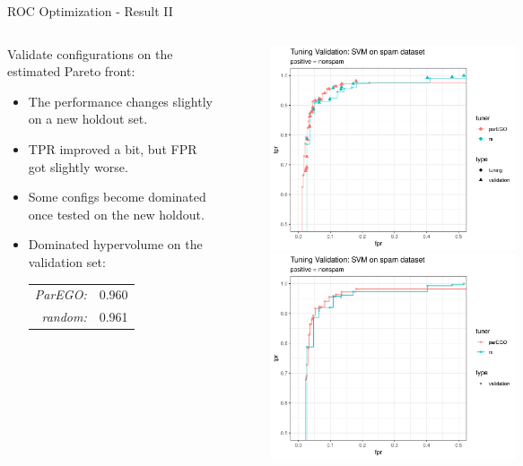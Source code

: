 \documentclass[11pt,compress,t,notes=noshow,xcolor=table]{beamer}
\begin{document}
\begin{vbframe}{ROC Optimization - Result II}

\begin{columns}
\begin{column}{0.42\textwidth}
Validate configurations on the estimated Pareto front:
\begin{itemize}
  \item The performance changes slightly on a new holdout set.
  \item TPR improved a bit, but FPR got slightly worse.
  \item Some configs become dominated once tested on the new holdout.
  \item Dominated hypervolume on the validation set:
  \begin{tabular}{rl}
    \emph{ParEGO:} & 0.960\\
    \emph{random:} & 0.961
  \end{tabular}
\end{itemize}
\end{column}
\begin{column}{0.8\textwidth}
\vspace{-0.2cm}
\begin{figure}
\includegraphics[width=0.52\textwidth]{slides/11-multicrit/figure_man/example_parego_spam_outer.png}\\
\includegraphics[width=0.52\textwidth]{slides/11-multicrit/figure_man/example_parego_spam_outer_pareto.png}
\end{figure}
\end{column}
\end{columns}

\end{vbframe}
\end{document}
